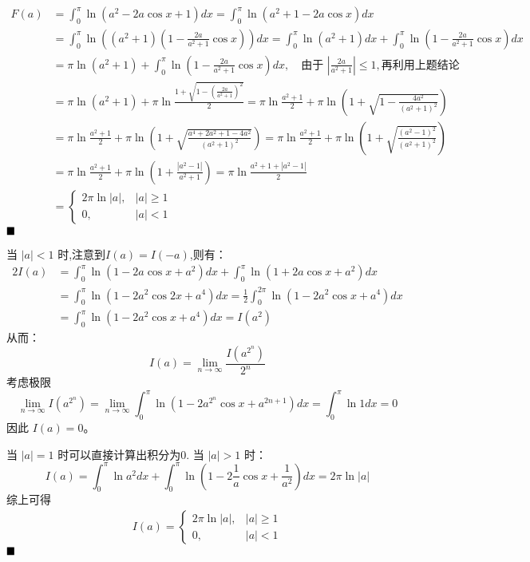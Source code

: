 \documentclass[lang=cn,newtx,10pt,scheme=chinese]{elegantbook}
\begin{document}
\begin{solution}[解法2]
\begin{align*}
F(a) &= \int_{0}^{\pi} \ln(a^2 - 2a\cos x + 1)dx = \int_{0}^{\pi} \ln(a^2+1-2a\cos x)dx \\
&= \int_{0}^{\pi} \ln\left((a^2+1)\left(1-\frac{2a}{a^2+1}\cos x\right)\right)dx = \int_{0}^{\pi}\ln(a^2+1)dx + \int_{0}^{\pi}\ln\left(1-\frac{2a}{a^2+1}\cos x\right)dx \\
&= \pi\ln(a^2+1) + \int_{0}^{\pi}\ln\left(1-\frac{2a}{a^2+1}\cos x\right)dx, \quad \text{由于 } |\frac{2a}{a^2+1}| \le 1, \text{再利用上题结论} \\
&= \pi\ln(a^2+1) + \pi\ln\frac{1+\sqrt{1-\left(\frac{2a}{a^2+1}\right)^2}}{2} = \pi\ln\frac{a^2+1}{2} + \pi\ln\left(1+\sqrt{1-\frac{4a^2}{(a^2+1)^2}}\right) \\
&= \pi\ln\frac{a^2+1}{2} + \pi\ln\left(1+\sqrt{\frac{a^4+2a^2+1-4a^2}{(a^2+1)^2}}\right) = \pi\ln\frac{a^2+1}{2} + \pi\ln\left(1+\sqrt{\frac{(a^2-1)^2}{(a^2+1)^2}}\right) \\
&= \pi\ln\frac{a^2+1}{2} + \pi\ln\left(1+\frac{|a^2-1|}{a^2+1}\right) = \pi\ln\frac{a^2+1+|a^2-1|}{2} \\
&= \begin{cases}
2\pi\ln|a|, & |a| \ge 1 \\
0, & |a| < 1
\end{cases}
\end{align*}
$\hfill \blacksquare$
\end{solution}

\begin{solution}[解法3]
        当 $|a| < 1$ 时,注意到$I(a)=I(-a)$,则有：
    \begin{align*} 2I(a) &= \int_{0}^{\pi} \ln(1-2a\cos x + a^2)dx + \int_{0}^{\pi} \ln(1+2a\cos x + a^2)dx \\ &= \int_{0}^{\pi} \ln(1-2a^2\cos 2x + a^4)dx = \frac{1}{2} \int_{0}^{2\pi} \ln(1-2a^2\cos x + a^4)dx \\ &= \int_{0}^{\pi} \ln(1-2a^2\cos x + a^4)dx = I(a^2)\end{align*}
    从而：
    $$ I(a) = \lim\limits_{n \to \infty} \frac{I(a^{2^n})}{2^n} $$
    考虑极限
    $$ \lim\limits_{n \to \infty} I(a^{2^n}) = \lim\limits_{n \to \infty} \int_{0}^{\pi} \ln(1-2a^{2^n}\cos x + a^{2n+1})dx = \int_{0}^{\pi} \ln 1 dx = 0 $$
    因此 $I(a)=0$。

    当 $|a|=1$ 时可以直接计算出积分为0.
    当 $|a| > 1$ 时：
    $$ I(a) = \int_{0}^{\pi} \ln a^2 dx + \int_{0}^{\pi} \ln(1-2\frac{1}{a}\cos x + \frac{1}{a^2})dx = 2\pi \ln |a| $$
综上可得
\begin{align*}
 I(a)= \begin{cases}
    2\pi\ln|a|, & |a| \ge 1 \\
    0, & |a| < 1
\end{cases}
\end{align*}
$\hfill \blacksquare$
\end{solution}
\end{document}
